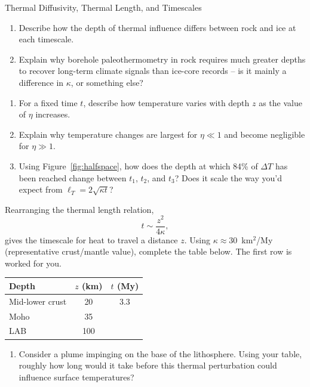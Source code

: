 \begin{activity}{Thermal Diffusivity, Thermal Length, and Timescales}
\begin{questions}
\begin{enumerate}[label=(\alph*)]
  \item Describe how the depth of thermal influence differs between rock and ice at each timescale.
  \answerbox[2.5cm]

  \item Explain why borehole paleothermometry in rock requires much greater depths to recover long-term climate signals than ice-core records -- is it mainly a difference in $\kappa$, or something else?
  \answerbox[2.5cm]
\end{enumerate}


\begin{enumerate}[label=(\alph*)]
  \item For a fixed time $t$, describe how temperature varies with depth $z$ as the value of $\eta$ increases.
  \answerbox[2cm]

  \item Explain why temperature changes are largest for $\eta \ll 1$ and become negligible for $\eta \gg 1$.
  \answerbox[2cm]

  \item Using Figure~\ref{fig:halfspace}, how does the depth at which 84\% of $\Delta T$ has been reached change between $t_1$, $t_2$, and $t_3$? Does it scale the way you'd expect from $\ell_T=2\sqrt{\kappa t}$?
  \answerbox[2cm]
\end{enumerate}


Rearranging the thermal length relation,
\[
t \sim \frac{z^2}{4\kappa},
\]
gives the timescale for heat to travel a distance $z$. Using $\kappa\approx30$~km$^2$/My (representative crust/mantle value), complete the table below. The first row is worked for you.

\begin{center}
\begin{tabular}{lcc}
\toprule
Depth & $z$ (km) & $t$ (My) \\
\midrule
Mid-lower crust & 20  & 3.3 \\
Moho            & 35  & \\
LAB             & 100 & \\
\bottomrule
\end{tabular}
\end{center}

\begin{enumerate}[label=(\alph*)]
  \item Consider a plume impinging on the base of the lithosphere. Using your table, roughly how long would it take before this thermal perturbation could influence surface temperatures?
  \answerbox[2cm]


\end{enumerate}
\end{questions}
\end{activity}
